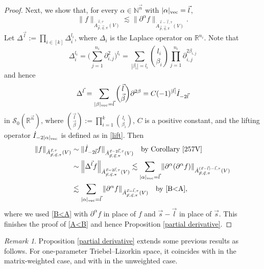 \documentclass[11pt, reqno]{amsart}
\theoremstyle{definition}
\theoremstyle{remark}
\newtheorem{remark}[theorem]{Remark}
\numberwithin{equation}{section}
\newcommand{\R}{\mathbb R}
\newcommand{\vn}{\vec n}
\newcommand{\vl}{\vec l}
\newcommand{\vp}{\vec p}
\newcommand{\vq}{\vec q}
\newcommand{\vs}{\vec s}
\newcommand{\Atau}{\dot A^{\vs,\tau}_{\vp,\vq,\pi}}
\newcommand{\abs}[1]{|#1|}
\begin{document}
\begin{proof}
Next, we show that, for every $\alpha\in \mathbb N^{\vec n}$ with $|\alpha|_{\rm{vec}}=\vec l$,
\begin{equation}\label{A<B}
\|f\|_{\Atau(V)}
\lesssim \|\partial^{\alpha} f\|_{\dot A_{\vec p,\vec q,\pi}^{\vec s-\vec l,\tau}(V)}.
\end{equation}
Let $\Delta^{\vec l}:=\prod_{i\in[k]}\Delta_i^{l_i}$,
where $\Delta_i$ is the Laplace operator on $\R^{n_i}$.
Note that
\begin{equation*}
\Delta_i^{l_i}=\Bigg(\sum_{j=1}^{n_i}\partial_{i,j}^2\Bigg)^{l_i}
=\sum_{\abs{\beta_i}=l_i}
\binom{l_i}{\beta_i}\prod_{j=1}^{n_i}\partial_{i,j}^{2\beta_{i,j}}
\end{equation*}
and hence
\begin{equation*}
\Delta^{\vec l}
=\sum_{\abs{\beta}_{\rm{vec}}=\vl}
\binom{\vec l}{\vec\beta}\partial^{2\beta}
= C (-1)^{|\vec l|} \dot I_{-2\vec l}
\end{equation*}
in $\mathcal S_0(\R^{\vn})$,
where $\binom{\vec l}{\vec\beta}:=\prod_{i=1}^k \binom{l_i}{\beta_i}$,
$C$ is a positive constant,
and the lifting operator $\dot I_{-2|\alpha|_{\rm{vec}}}$ is defined as in \eqref{lift}. Then
\begin{equation*}
\begin{split}
\|f\|_{\Atau(V)}
&\sim \|\dot I_{-2\vec l} f\|_{\dot A_{\vec p,\vec q,\pi}^{\vec s-2\vec l,\tau}(V)}
\quad\text{by Corollary \ref{257V}} \\
&\sim \Big\|\Delta^{\vec l} f\Big\|_{\dot A_{\vec p,\vec q,\pi}^{\vec s-2\vec l,\tau}(V)}
\lesssim\sum_{\abs{\alpha}_{\rm{vec}}=\vl}
\|\partial^{\alpha}(\partial^{\alpha} f)\|_{\dot A_{\vec p,\vec q,\pi}^{(\vec s-\vec l)-\vec l,\tau}(V)} \\
&\lesssim \sum_{|\alpha|_{\rm{vec}}=\vec l}
\|\partial^{\alpha} f\|_{\dot A_{\vec p,\vec q,\pi}^{\vec s-\vec l,\tau}(V)} \quad\text{by \eqref{B<A}},
\end{split}
\end{equation*}
where we used \eqref{B<A} with $\partial^{\alpha}f$ in place of $f$ and $\vec s-\vec l$ in place of $\vec s$.
This finishes the proof of \eqref{A<B}
and hence Proposition \ref{partial derivative}.
\end{proof}

\begin{remark}
Proposition \ref{partial derivative} extends some previous results as follows.
For one-parameter Triebel--Lizorkin space, it coincides with
\cite[Proposition 7.3]{FR21} in the matrix-weighted case,
and with \cite[(5.6)]{FJW91} in the unweighted case.
\end{remark}
\end{document}
